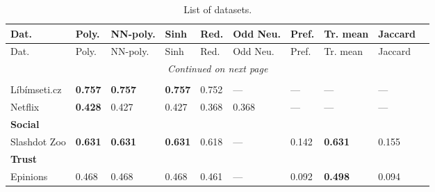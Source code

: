 
\begin{longtable}{ lllllllll }

\caption[List of datasets]{List of datasets.} \\

Dat.       & Poly. & NN-poly. & Sinh  & Red.  & Odd Neu. & Pref. & Tr. mean & Jaccard \ \\
\hline

\endfirsthead

Dat.       & Poly. & NN-poly. & Sinh  & Red.  & Odd Neu. & Pref. & Tr. mean & Jaccard \ \\
\hline

\endhead

\hline
\multicolumn{9}{c}{\textit{Continued on next page}} \\* 
\hline

\endfoot

\hline \hline
\endlastfoot


\hline
\multicolumn{9}{|l|}{\textbf{Ratings}} \\
\hline
L\'ib\'imseti.cz & \bf{0.757} & \bf{0.757} & \bf{0.757} & 0.752 & --- & --- & --- & --- \\
Netflix      & \bf{0.428} & 0.427 & 0.427 & 0.368 & 0.368 & --- & --- & --- \\

\hline
\multicolumn{9}{|l|}{\textbf{Social}} \\
\hline
Slashdot Zoo & \bf{0.631} & \bf{0.631} & \bf{0.631} & 0.618 & --- & 0.142 & \bf{0.631} & 0.155 \\

\hline
\multicolumn{9}{|l|}{\textbf{Trust}} \\
\hline
Epinions     & 0.468 & 0.468 & 0.468 & 0.461 & --- & 0.092 & \bf{0.498} & 0.094 \\

      \hline
    \end{longtable} 

